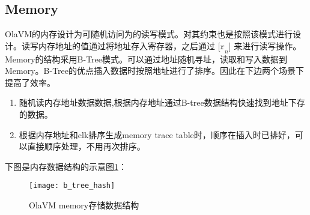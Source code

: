 \subsection{Memory}\label{subsec: processor-memory}
OlaVM的内存设计为可随机访问为的读写模式。对其约束也是按照该模式进行设计。读写内存地址的值通过将地址存入寄存器，之后通过 $\texttt{[r}_n\texttt{]}$ 来进行读写操作。
Memory的结构采用B-Tree模式。可以通过地址随机寻址，读取和写入数据到Memory。B-Tree的优点插入数据时按照地址进行了排序。因此在下边两个场景下提高了效率。
\begin{enumerate}
    \item 随机读内存地址数据数据,根据内存地址通过B-tree数据结构快速找到地址下存的数据。
    \item 根据内存地址和clk排序生成memory trace table时，顺序在插入时已排好，可以直接顺序处理，不用再次排序。
\end{enumerate}

下图是内存数据结构的示意图\ref{fig: B-tree-memory}：
\begin{figure}[!htp]
    \centering
    \texttt{[image: b\_tree\_hash]}
    \caption{OlaVM memory存储数据结构}
    \label{fig: B-tree-memory}
\end{figure}